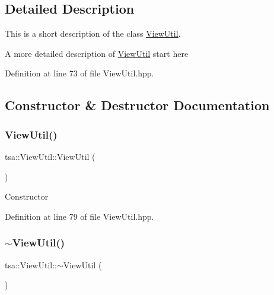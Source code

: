 \subsection{Detailed Description}
This is a short description of the class \hyperlink{classtsa_1_1_view_util}{View\+Util}. 

A more detailed description of \hyperlink{classtsa_1_1_view_util}{View\+Util} start here 

Definition at line 73 of file View\+Util.\+hpp.



\subsection{Constructor \& Destructor Documentation}
\mbox{\label{classtsa_1_1_view_util_a13cb83b6780a27612d34d893272e72f9}} 
\subsubsection{\texorpdfstring{View\+Util()}{ViewUtil()}}
{\footnotesize\ttfamily tsa\+::\+View\+Util\+::\+View\+Util (\begin{DoxyParamCaption}{ }\end{DoxyParamCaption})\hspace{0.3cm}{\ttfamily [inline]}}

Constructor 

Definition at line 79 of file View\+Util.\+hpp.

\mbox{\label{classtsa_1_1_view_util_a3c85be8329c8c4f7d60d8ba78b59b4e4}} 
\subsubsection{\texorpdfstring{$\sim$\+View\+Util()}{~ViewUtil()}}
{\footnotesize\ttfamily tsa\+::\+View\+Util\+::$\sim$\+View\+Util (\begin{DoxyParamCaption}{ }\end{DoxyParamCaption})\hspace{0.3cm}{\ttfamily [inline]}}

